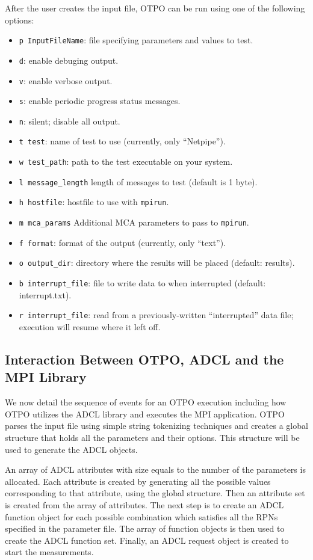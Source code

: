 After the user creates the input file, OTPO can be run using one of the following options:
\begin{itemize}
\item {\tt p InputFileName}: file specifying parameters and values to test.
\item {\tt d}: enable debuging output.
\item {\tt v}: enable verbose output.
\item {\tt s}: enable periodic progress status messages.
\item {\tt n}: silent; disable all output.
\item {\tt t test}: name of test to use (currently, only ``Netpipe'').
\item {\tt w test\_\-path}: path to the test executable on your system.
\item {\tt l message\_\-length} length of messages to test (default is 1 byte).
\item {\tt h hostfile}: hostfile to use with {\tt mpirun}.
\item {\tt m mca\_\-params} Additional MCA parameters to pass to {\tt mpirun}.
\item {\tt f format}: format of the output (currently, only ``text'').
\item {\tt o output\_\-dir}: directory where the results will be placed (default: results).
\item {\tt b interrupt\_\-file}: file to write data to when interrupted (default:
  interrupt.txt).
\item {\tt r interrupt\_\-file}: read from a previously-written
  ``interrupted'' data file; execution will resume where it left off.
\end{itemize}

\subsection{Interaction Between OTPO, ADCL and the MPI Library}

We now detail the sequence of events for an OTPO execution including how OTPO utilizes the ADCL library and executes the MPI application. OTPO parses the input file using simple string tokenizing techniques and creates a
global structure that holds all the parameters and their options. This
structure will be used to generate the ADCL objects. 

An array of ADCL attributes with size equals to the number of the parameters
is allocated. Each attribute is created by generating all the possible values
corresponding to that attribute, using the global structure. Then an attribute
set is created from the array of attributes. The next step is to create an
ADCL function object for each possible combination which satisfies all the RPNs specified in
the parameter file. The array of function objects is then used to create the ADCL function set. 
Finally, an ADCL request object is created to start the measurements.

